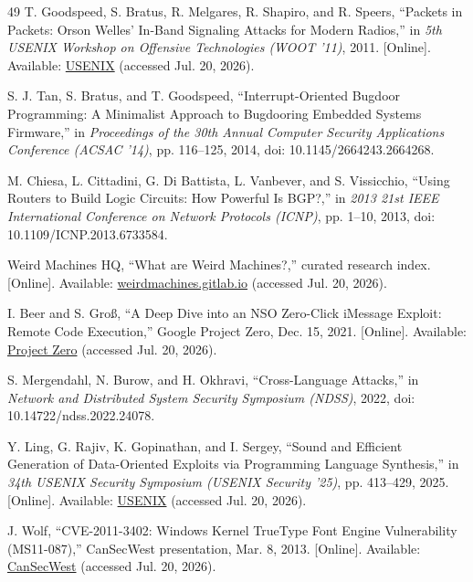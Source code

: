 \documentclass[conference]{IEEEtran}
\begin{document}
\begin{thebibliography}{49}
T. Goodspeed, S. Bratus, R. Melgares, R. Shapiro, and R. Speers, ``Packets in Packets: Orson Welles' In-Band Signaling Attacks for Modern Radios,'' in \emph{5th USENIX Workshop on Offensive Technologies (WOOT '11)}, 2011. [Online]. Available: \href{https://www.usenix.org/legacy/event/woot11/tech/final_files/Goodspeed.pdf}{USENIX} (accessed Jul. 20, 2026).

S. J. Tan, S. Bratus, and T. Goodspeed, ``Interrupt-Oriented Bugdoor Programming: A Minimalist Approach to Bugdooring Embedded Systems Firmware,'' in \emph{Proceedings of the 30th Annual Computer Security Applications Conference (ACSAC '14)}, pp. 116--125, 2014, doi: 10.1145/2664243.2664268.

M. Chiesa, L. Cittadini, G. Di Battista, L. Vanbever, and S. Vissicchio, ``Using Routers to Build Logic Circuits: How Powerful Is BGP?,'' in \emph{2013 21st IEEE International Conference on Network Protocols (ICNP)}, pp. 1--10, 2013, doi: 10.1109/ICNP.2013.6733584.

Weird Machines HQ, ``What are Weird Machines?,'' curated research index. [Online]. Available: \href{https://weirdmachines.gitlab.io/}{weirdmachines.gitlab.io} (accessed Jul. 20, 2026).

I. Beer and S. Gro\ss, ``A Deep Dive into an NSO Zero-Click iMessage Exploit: Remote Code Execution,'' Google Project Zero, Dec. 15, 2021. [Online]. Available: \href{https://projectzero.google/2021/12/a-deep-dive-into-nso-zero-click.html}{Project Zero} (accessed Jul. 20, 2026).

S. Mergendahl, N. Burow, and H. Okhravi, ``Cross-Language Attacks,'' in \emph{Network and Distributed System Security Symposium (NDSS)}, 2022, doi: 10.14722/ndss.2022.24078.

Y. Ling, G. Rajiv, K. Gopinathan, and I. Sergey, ``Sound and Efficient Generation of Data-Oriented Exploits via Programming Language Synthesis,'' in \emph{34th USENIX Security Symposium (USENIX Security '25)}, pp. 413--429, 2025. [Online]. Available: \href{https://www.usenix.org/conference/usenixsecurity25/presentation/ling}{USENIX} (accessed Jul. 20, 2026).

J. Wolf, ``CVE-2011-3402: Windows Kernel TrueType Font Engine Vulnerability (MS11-087),'' CanSecWest presentation, Mar. 8, 2013. [Online]. Available: \href{https://cansecwest.com/slides/2013/Analysis%20of%20a%20Windows%20Kernel%20Vuln.pdf}{CanSecWest} (accessed Jul. 20, 2026).

\end{thebibliography}
\end{document}
